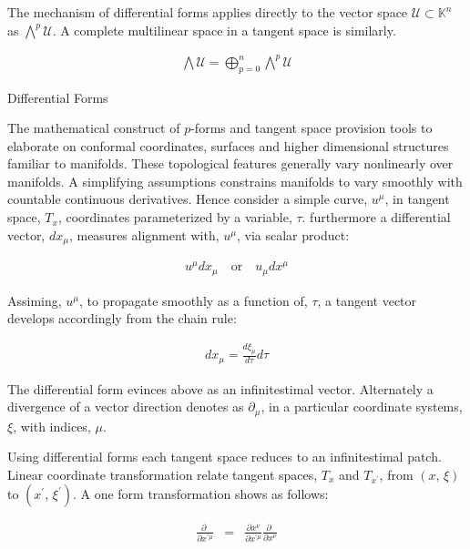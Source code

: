\documentclass[aps,twocolumn,secnumarabic,nobalancelastpage,amsmath,amssymb,
amsthm,nofootinbib,parskip=full]{revtex4}
\numberwithin{equation}{section}
\newcommand{\pa}[1]{\left(#1\right)}
\begin{document}
The mechanism of differential forms applies directly to the vector space
$\mathscr{U}\subset\mathbb{K}^n$ as ${\bigwedge}^p\mathscr{U}$.
A complete multilinear space in a tangent space is similarly.

\begin{equation*}
\begin{array}{rcl}
\bigwedge\mathscr{U}=\bigoplus^n_{p=0}{\bigwedge}^p\mathscr{U}
\end{array}
\end{equation*}

Differential Forms

The mathematical construct of $p$-forms and tangent space provision tools
to elaborate on conformal coordinates, surfaces and higher dimensional
structures familiar to manifolds.
These topological features generally vary nonlinearly
over manifolds. A simplifying assumptions constrains manifolds to vary
smoothly with countable continuous derivatives.
Hence consider a simple curve, $u^\mu$, in tangent space, $T_x$, coordinates
parameterized by a variable, $\tau$. furthermore a differential vector,
$dx_\mu$, measures alignment with, $u^\mu$, via scalar product:

\begin{equation*}
\begin{array}{c}
u^\mu dx_\mu\quad\text{or}\quad u_\mu dx^\mu
\end{array}
\end{equation*}

Assiming, $u^\mu$, to propagate smoothly as a function of, $\tau$,
a tangent vector develops accordingly from the chain rule:

\begin{equation*}
\begin{array}{c}
dx_\mu=\frac{d\xi_\mu}{d\tau}d\tau
\end{array}
\end{equation*}

The differential form evinces above as an infinitestimal vector.
Alternately a divergence of a vector direction denotes as $\partial_\mu$,
in a particular coordinate systems, $\xi$, with indices, $\mu$.

Using differential forms each tangent space reduces to an infinitestimal
patch. Linear coordinate transformation relate tangent spaces,
$T_x$ and $T_{x^\prime}$, from $\pa{x,\,\xi}$ to
$\pa{x^\prime,\,\xi^{\prime}}$. A one form transformation
shows as follows:

\begin{equation*}
\begin{array}{rcl}
\frac{\partial\;}{\partial x^{\prime\mu}}&=&
                \frac{\partial x^\nu}{\partial x^{\prime\mu}}
                      \frac{\partial\;}{\partial x^\nu}
\end{array}
\end{equation*}
\end{document}
